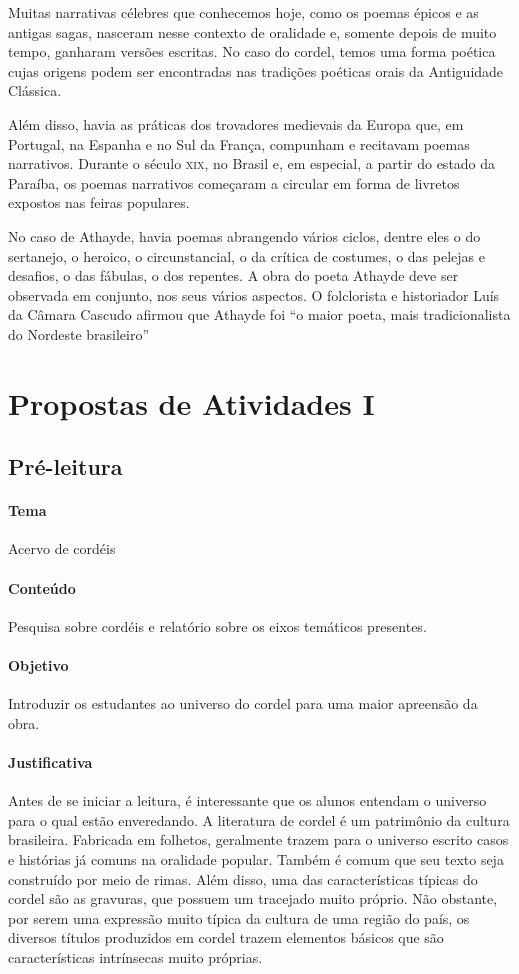 \documentclass[12pt]{extarticle}
\begin{document}
Muitas narrativas célebres que conhecemos hoje, como os poemas épicos e as
antigas sagas, nasceram nesse contexto de oralidade e, somente depois de muito
tempo, ganharam versões escritas. No caso do cordel, temos uma forma poética
cujas origens podem ser encontradas nas tradições poéticas orais da Antiguidade
Clássica.

Além disso, havia as práticas dos trovadores medievais da Europa que, em
Portugal, na Espanha e no Sul da França, compunham e recitavam poemas
narrativos. Durante o século \textsc{xix}, no Brasil e, em especial, a partir
do estado da Paraíba, os poemas narrativos começaram a circular em forma de
livretos expostos nas feiras populares.

No caso de Athayde, havia poemas abrangendo vários ciclos, dentre eles o do
sertanejo, o heroico, o circunstancial, o da crítica de costumes, o das pelejas
e desafios, o das fábulas, o dos repentes. A obra do poeta Athayde deve ser
observada em conjunto, nos seus vários aspectos. O folclorista e historiador
Luís da Câmara Cascudo afirmou que Athayde foi ``o maior poeta, mais
tradicionalista do Nordeste brasileiro''

\section{Propostas de Atividades I}

\subsection{Pré-leitura}

\paragraph{Tema} Acervo de cordéis

\paragraph{Conteúdo} Pesquisa sobre cordéis e relatório sobre os eixos
temáticos presentes.

\paragraph{Objetivo} Introduzir os estudantes ao universo do cordel para uma
maior apreensão da obra.

\paragraph{Justificativa} Antes de se iniciar a leitura, é interessante que os
alunos entendam o universo para o qual estão enveredando. A literatura de
cordel é um patrimônio da cultura brasileira. Fabricada em folhetos, geralmente
trazem para o universo escrito casos e histórias já comuns na oralidade
popular. Também é comum que seu texto seja construído por meio de rimas. Além
disso, uma das características típicas do cordel são as gravuras, que possuem
um tracejado muito próprio. Não obstante, por serem uma expressão muito típica
da cultura de uma região do país, os diversos títulos produzidos em cordel
trazem elementos básicos que são características intrínsecas muito próprias.
\end{document}
